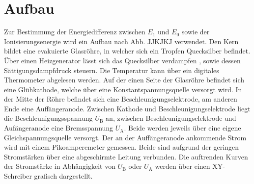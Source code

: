 \section{Aufbau}
\label{sec:Aufbau}
Zur Bestimmung der Energiedifferenz zwischen $E_1$ und $E_0$ sowie der Ionisierungsenergie
wird ein Aufbau nach Abb. JJKJKJ verwendet. Den Kern bildet eine evakuierte Glasröhre,
in welcher sich ein Tropfen Quecksilber befindet. Über einen Heizgenerator lässt
sich das Quecksilber verdampfen , sowie dessen Sättigungsdampfdruck steuern. Die
Temperatur kann über ein digitales Thermometer abgelesen werden. Auf der einen Seite
der Glasröhre befindet sich eine Glühkathode, welche über eine Konstantspannungsquelle
versorgt wird. In der Mitte der Röhre befindet sich eine Beschleunigungselektrode,
am anderen Ende eine Auffängeranode. Zwischen Kathode und Beschleunigungselektrode
liegt die Beschleunigungsspannung $U_\text{B}$ an, zwischen Beschleunigungselektrode
und Aufängeranode eine Bremsspannung $U_\text{A}$. Beide werden jeweils über eine
eigene Gleichspannungsquelle versorgt. Der an der Auffängeranode ankommende Strom
wird mit einem Pikoamperemeter gemessen. Beide sind aufgrund der geringen Stromstärken
über eine abgeschirmte Leitung verbunden. Die auftrenden Kurven der Stromstärke in Abhängigkeit
von $U_\text{B}$ oder $U_\text{A}$ werden über einen XY-Schreiber grafisch dargestellt. 
